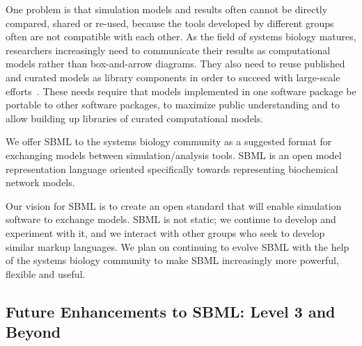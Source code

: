 \documentclass[10pt]{cekarticle}
\begin{document}
One problem is that simulation models and results often cannot be directly
compared, shared or re-used, because the tools developed by different
groups often are not compatible with each other.  As the field of systems
biology matures, researchers increasingly need to communicate their results
as computational models rather than box-and-arrow diagrams.  They also need
to reuse published and curated models as library components in order to
succeed with large-scale efforts~\cite[e.g., the Alliance for Cellular
Signaling;][]{gilman:2000,smaglik:2000}.  These needs require that models
implemented in one software package be portable to other software packages,
to maximize public understanding and to allow building up libraries of
curated computational models.

We offer SBML to the systems biology community as a suggested
format for exchanging models between simulation/analysis tools.
SBML is an open model representation language oriented
specifically towards representing biochemical network models.

Our vision for SBML is to create an open standard that will enable
simulation software to exchange models.  SBML is not static; we continue to
develop and experiment with it, and we interact with other groups who seek
to develop similar markup languages.  We plan on continuing to evolve SBML
with the help of the systems biology community to make SBML increasingly
more powerful, flexible and useful.


\subsection{Future Enhancements to SBML: Level 3 and Beyond}
\label{sec:level-3}
\end{document}
